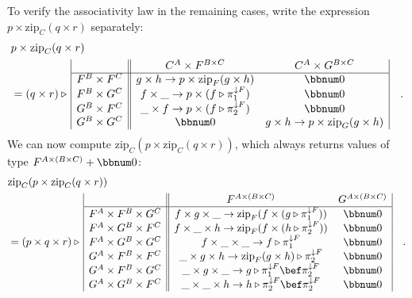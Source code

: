 To verify the associativity law in the remaining cases, write the
expression $p\times\text{zip}_{C}(q\times r)$ separately:
\begin{align*}
 & p\times\text{zip}_{C}(q\times r)\\
 & =(q\times r)\triangleright\,\begin{array}{|c||cc|}
 & C^{A}\times F^{B\times C} & C^{A}\times G^{B\times C}\\
\hline F^{B}\times F^{C} & g\times h\rightarrow p\times\text{zip}_{F}(g\times h) & \bbnum 0\\
F^{B}\times G^{C} & f\times\_\rightarrow p\times(f\triangleright\pi_{1}^{\downarrow F}) & \bbnum 0\\
G^{B}\times F^{C} & \_\times f\rightarrow p\times(f\triangleright\pi_{2}^{\downarrow F}) & \bbnum 0\\
G^{B}\times G^{C} & \bbnum 0 & g\times h\rightarrow p\times\text{zip}_{G}(g\times h)
\end{array}\quad.
\end{align*}
We can now compute $\text{zip}_{C}(p\times\text{zip}_{C}(q\times r))$,
which always returns values of type $F^{A\times(B\times C)}+\bbnum 0$:
\begin{align*}
 & \text{zip}_{C}(p\times\text{zip}_{C}(q\times r))\\
 & =(p\times q\times r)\triangleright\,\begin{array}{|c||cc|}
 & F^{A\times(B\times C)} & G^{A\times(B\times C)}\\
\hline F^{A}\times F^{B}\times G^{C} & f\times g\times\_\rightarrow\text{zip}_{F}(f\times(g\triangleright\pi_{1}^{\downarrow F})) & \bbnum 0\\
F^{A}\times G^{B}\times F^{C} & f\times\_\times h\rightarrow\text{zip}_{F}(f\times(h\triangleright\pi_{2}^{\downarrow F})) & \bbnum 0\\
F^{A}\times G^{B}\times G^{C} & f\times\_\times\_\rightarrow f\triangleright\pi_{1}^{\downarrow F} & \bbnum 0\\
G^{A}\times F^{B}\times F^{C} & \_\times g\times h\rightarrow\text{zip}_{F}(g\times h)\triangleright\pi_{2}^{\downarrow F} & \bbnum 0\\
G^{A}\times F^{B}\times G^{C} & \_\times g\times\_\rightarrow g\triangleright\pi_{1}^{\downarrow F}\bef\pi_{2}^{\downarrow F} & \bbnum 0\\
G^{A}\times G^{B}\times F^{C} & \_\times\_\times h\rightarrow h\triangleright\pi_{2}^{\downarrow F}\bef\pi_{2}^{\downarrow F} & \bbnum 0
\end{array}\quad.
\end{align*}

